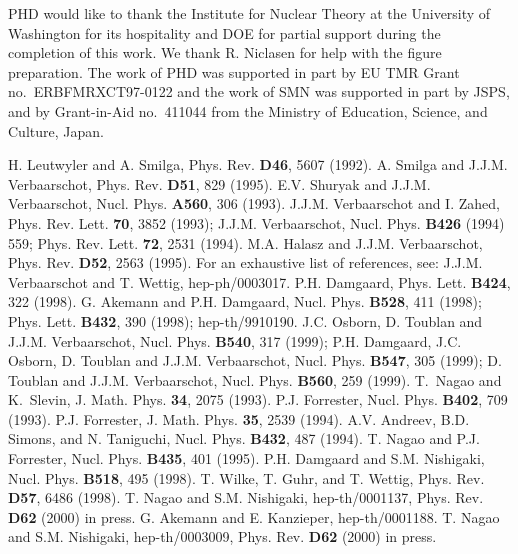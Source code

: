PHD would like to thank the Institute for Nuclear Theory
at the University of Washington for its hospitality and
DOE for partial support during the completion of this work.
We thank R. Niclasen for help with the figure preparation.
The work of PHD was supported in part by EU TMR Grant no.\ 
ERBFMRXCT97-0122
and the work of SMN was supported in part by JSPS, and
by Grant-in-Aid no.\ 411044
from the Ministry of Education, Science, and Culture, Japan.
\begin{references}
H. Leutwyler and A. Smilga,
Phys. Rev. {\bf D46}, 5607 (1992).
A. Smilga and J.J.M. Verbaarschot,
Phys. Rev. {\bf D51}, 829 (1995).
E.V. Shuryak and J.J.M. Verbaarschot,
Nucl. Phys. {\bf A560}, 306 (1993).
J.J.M. Verbaarschot and I. Zahed,
Phys. Rev. Lett. {\bf 70}, 3852 (1993);
\newline J.J.M. Verbaarschot, Nucl. Phys. {\bf B426} (1994) 559;
Phys. Rev. Lett. {\bf 72}, 2531 (1994).
M.A. Halasz and J.J.M. Verbaarschot,
Phys. Rev. {\bf D52}, 2563 (1995).
For an exhaustive list of references, see:
J.J.M. Verbaarschot and T. Wettig,  hep-ph/0003017.
P.H. Damgaard, Phys. Lett. {\bf B424}, 322 (1998).
\newline
G. Akemann and P.H. Damgaard, Nucl. Phys. {\bf B528}, 411 (1998);
Phys. Lett. {\bf B432}, 390 (1998);  hep-th/9910190.
J.C. Osborn, D. Toublan and J.J.M. Verbaarschot,
Nucl. Phys. 
{\bf B540}, 317 (1999);
\newline 
P.H. Damgaard, J.C. Osborn, D. Toublan and J.J.M. Verbaarschot,
Nucl. Phys. {\bf B547}, 305 (1999);
\newline  
D. Toublan and J.J.M. Verbaarschot,
Nucl. Phys. {\bf B560}, 259 (1999).
T.~Nagao and K.~Slevin,
J. Math. Phys. {\bf 34}, 2075 (1993).
P.J. Forrester, Nucl. Phys. {\bf B402}, 709 (1993).
P.J. Forrester, J. Math. Phys. {\bf 35}, 2539 (1994).
A.V. Andreev, B.D. Simons, and N. Taniguchi,
Nucl. Phys. {\bf B432}, 487 (1994).
T. Nagao and P.J. Forrester,
Nucl. Phys. {\bf B435}, 401 (1995).
P.H. Damgaard and S.M. Nishigaki,
Nucl. Phys. {\bf B518}, 495 (1998).
T. Wilke, T. Guhr, and T. Wettig,
Phys. Rev. {\bf D57}, 6486 (1998).
T. Nagao and S.M. Nishigaki,  hep-th/0001137,
Phys. Rev. {\bf D62} (2000) in press.
G. Akemann and E. Kanzieper,  hep-th/0001188.
T. Nagao and S.M. Nishigaki,  hep-th/0003009,
Phys. Rev. {\bf D62} (2000) in press.

\end{references}
